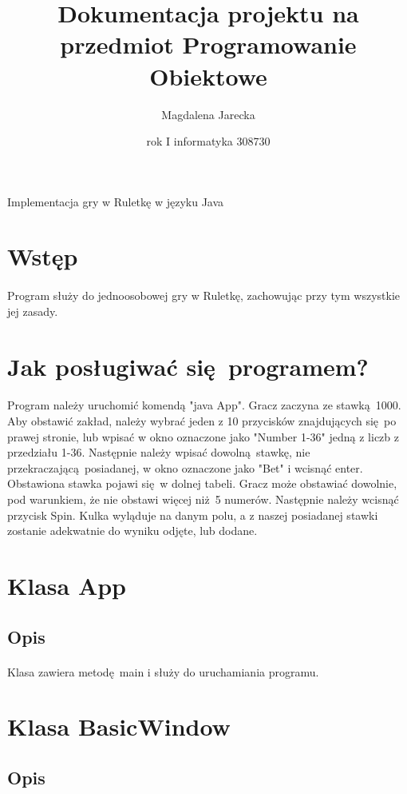\documentclass[11pt,a4paper]{article}
\title{Dokumentacja projektu na przedmiot Programowanie Obiektowe}
\author{Magdalena Jarecka}
\date{rok I informatyka 308730}
\begin{document}
\maketitle
Implementacja gry w Ruletkę w języku Java
\tableofcontents

\section{Wstęp}

\paragraph{}
Program służy do jednoosobowej gry w Ruletkę, zachowując przy tym wszystkie jej zasady.

\section{Jak posługiwać się programem?}
\paragraph{}
Program należy uruchomić komendą "java App". Gracz zaczyna ze stawką 1000. Aby obstawić zakład, należy wybrać jeden z 10 przycisków znajdujących się po prawej stronie, lub wpisać w okno oznaczone jako "Number 1-36" jedną z liczb z przedziału 1-36. Następnie należy wpisać dowolną stawkę, nie przekraczającą posiadanej, w okno oznaczone jako "Bet" i wcisnąć enter. Obstawiona stawka pojawi się w dolnej tabeli. Gracz
może obstawiać dowolnie, pod warunkiem, że nie obstawi więcej niż 5 numerów. Następnie należy wcisnąć przycisk Spin. Kulka wyląduje na danym polu, a z naszej posiadanej stawki zostanie adekwatnie do wyniku odjęte, lub dodane.
\section{Klasa App}
\subsection{Opis}
\paragraph{}
Klasa zawiera metodę main i służy do uruchamiania programu.
\section{Klasa BasicWindow}
\subsection{Opis}
\end{document}
